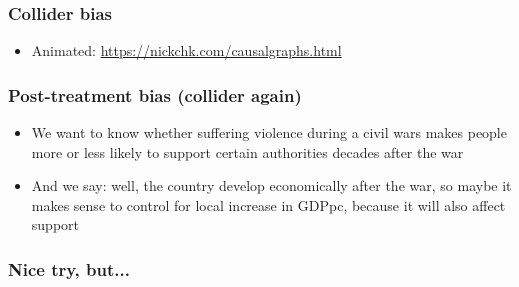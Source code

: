\documentclass[aspectratio=43]{beamer}
\begin{document}
\begin{frame}
\frametitle{Collider bias}
\centering

\begin{itemize}
  \item Animated: \url{https://nickchk.com/causalgraphs.html}
\end{itemize}

\end{frame}


\begin{frame}
\frametitle{Post-treatment bias (collider again)}\label{ptbias}
\centering

\begin{itemize}[<+->]
  \item We want to know whether suffering violence during a civil wars makes people more or less likely to support certain authorities decades after the war
  \item And we say: well, the country develop economically after the war, so maybe it makes sense to control for local increase in GDPpc, because it will also affect support
\end{itemize}

\end{frame}

\begin{frame}
\frametitle{Nice try, but...}
\centering


\end{frame}
\end{document}
